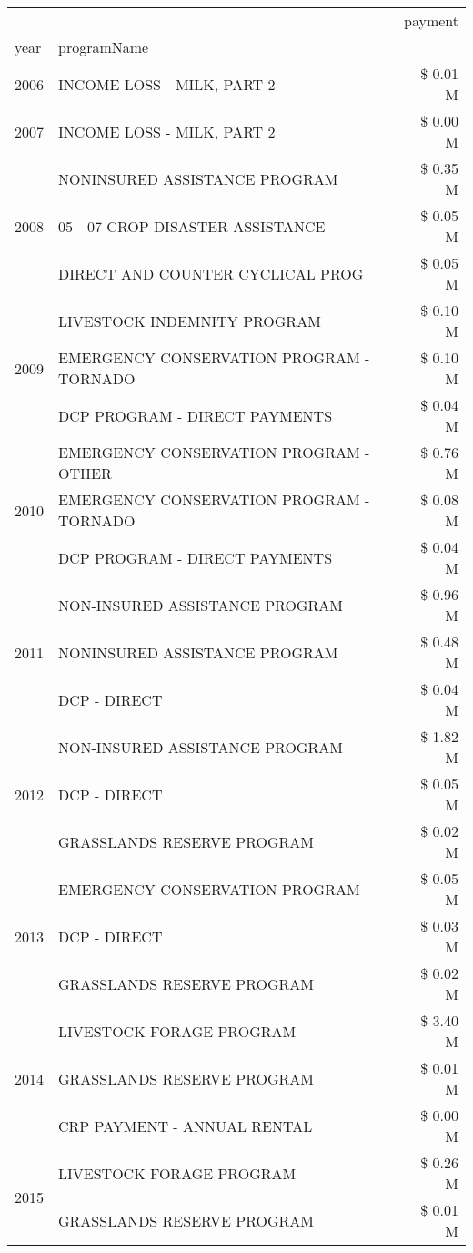 \begin{tabular}{llr}
\toprule
 &  & payment \\
year & programName &  \\
\midrule
2006 & INCOME LOSS - MILK, PART 2 & \$ 0.01 M \\
\cline{1-3}
2007 & INCOME LOSS - MILK, PART 2 & \$ 0.00 M \\
\cline{1-3}
\multirow[t]{3}{*}{2008} & NONINSURED ASSISTANCE PROGRAM & \$ 0.35 M \\
 & 05 - 07 CROP DISASTER ASSISTANCE & \$ 0.05 M \\
 & DIRECT AND COUNTER CYCLICAL PROG & \$ 0.05 M \\
\cline{1-3}
\multirow[t]{3}{*}{2009} & LIVESTOCK INDEMNITY PROGRAM & \$ 0.10 M \\
 & EMERGENCY CONSERVATION PROGRAM - TORNADO & \$ 0.10 M \\
 & DCP PROGRAM - DIRECT PAYMENTS & \$ 0.04 M \\
\cline{1-3}
\multirow[t]{3}{*}{2010} & EMERGENCY CONSERVATION PROGRAM - OTHER & \$ 0.76 M \\
 & EMERGENCY CONSERVATION PROGRAM - TORNADO & \$ 0.08 M \\
 & DCP PROGRAM - DIRECT PAYMENTS & \$ 0.04 M \\
\cline{1-3}
\multirow[t]{3}{*}{2011} & NON-INSURED ASSISTANCE PROGRAM & \$ 0.96 M \\
 & NONINSURED ASSISTANCE PROGRAM & \$ 0.48 M \\
 & DCP - DIRECT & \$ 0.04 M \\
\cline{1-3}
\multirow[t]{3}{*}{2012} & NON-INSURED ASSISTANCE PROGRAM & \$ 1.82 M \\
 & DCP - DIRECT & \$ 0.05 M \\
 & GRASSLANDS RESERVE PROGRAM & \$ 0.02 M \\
\cline{1-3}
\multirow[t]{3}{*}{2013} & EMERGENCY CONSERVATION PROGRAM & \$ 0.05 M \\
 & DCP - DIRECT & \$ 0.03 M \\
 & GRASSLANDS RESERVE PROGRAM & \$ 0.02 M \\
\cline{1-3}
\multirow[t]{3}{*}{2014} & LIVESTOCK FORAGE PROGRAM & \$ 3.40 M \\
 & GRASSLANDS RESERVE PROGRAM & \$ 0.01 M \\
 & CRP PAYMENT - ANNUAL RENTAL & \$ 0.00 M \\
\cline{1-3}
\multirow[t]{3}{*}{2015} & LIVESTOCK FORAGE PROGRAM & \$ 0.26 M \\
 & GRASSLANDS RESERVE PROGRAM & \$ 0.01 M \\

\end{tabular}
